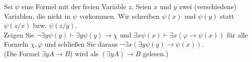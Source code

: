 
\begin{exercise}[100]

Sei $\psi$ eine Formel mit der freien Variable $z$. Seien $x$ und $y$ zwei
(verschiedene) Variablen, die nicht in $\psi$ vorkommen. Wir schreiben $\psi(x)$
und $\psi(y)$ statt $\psi(z/x)$ bzw. $\psi(z/y)$. \\
Zeigen Sie $\neg \exists y \psi(y) \vdash \exists y \psi(y) \rightarrow \chi$
und $\exists x  \psi(x) \vdash \exists x (\varphi \rightarrow \psi(x))$
für alle Formeln $\chi, \varphi$ und schließen Sie daraus
$\neg \exists x (\exists y \psi(y) \rightarrow \psi(x))$. \\
(Die Formel $\exists y A \rightarrow B$) wird als $(\exists y A) \rightarrow B$ gelesen.)

\end{exercise}


\begin{solution}

\phantom{}

\end{solution}


